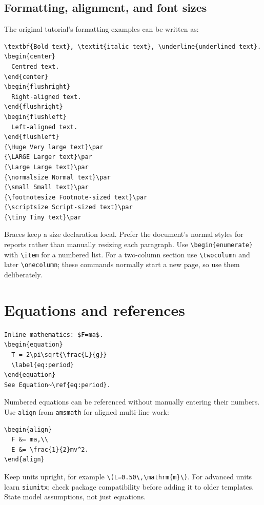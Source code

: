 \documentclass[11pt]{article}
\begin{document}
\subsection{Formatting, alignment, and font sizes}
The original tutorial's formatting examples can be written as:
\begin{lstlisting}
\textbf{Bold text}, \textit{italic text}, \underline{underlined text}.
\begin{center}
  Centred text.
\end{center}
\begin{flushright}
  Right-aligned text.
\end{flushright}
\begin{flushleft}
  Left-aligned text.
\end{flushleft}
{\Huge Very large text}\par
{\LARGE Larger text}\par
{\Large Large text}\par
{\normalsize Normal text}\par
{\small Small text}\par
{\footnotesize Footnote-sized text}\par
{\scriptsize Script-sized text}\par
{\tiny Tiny text}\par
\end{lstlisting}
Braces keep a size declaration local. Prefer the document's normal styles for
reports rather than manually resizing each paragraph.
Use \verb|\begin{enumerate}| with \verb|\item| for a numbered list.
For a two-column section use \verb|\twocolumn| and later \verb|\onecolumn|;
these commands normally start a new page, so use them deliberately.

\section{Equations and references}
\begin{lstlisting}
Inline mathematics: $F=ma$.
\begin{equation}
  T = 2\pi\sqrt{\frac{L}{g}}
  \label{eq:period}
\end{equation}
See Equation~\ref{eq:period}.
\end{lstlisting}
Numbered equations can be referenced without manually entering their numbers.
Use \texttt{align} from \texttt{amsmath} for aligned multi-line work:
\begin{lstlisting}
\begin{align}
  F &= ma,\\
  E &= \frac{1}{2}mv^2.
\end{align}
\end{lstlisting}
Keep units upright, for example \verb|\(L=0.50\,\mathrm{m}\)|.
For advanced units learn \texttt{siunitx}; check package compatibility
before adding it to older templates.
State model assumptions, not just equations.
\end{document}
